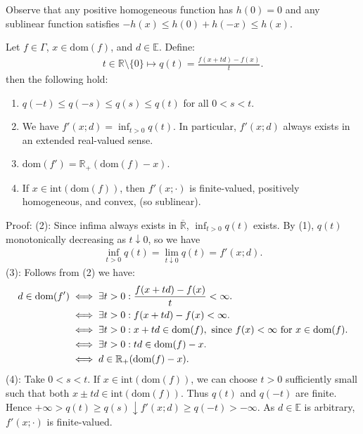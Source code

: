 \documentclass{tufte-handout}
\begin{document}
Observe that any positive homogeneous function has \( h(0) = 0 \) and
any sublinear function satisfies \( -h(x) \le h(0) + h(-x) \le h(x) \).

\begin{Proposition}
    Let \( f\in \Gamma \), \( x\in \text{dom}(f) \), and \( d \in \mathbb{E} \).
    Define:
    \begin{align}
        t\in \mathbb{R} \setminus \{0\} \mapsto q(t) = \frac{f(x + td) - f(x)}{t}.
    \end{align}
    then the following hold:
    \begin{enumerate}
            \item \( q(-t) \leq q(-s) \leq q(s) \leq q(t) \) for all \( 0<s<t \).
            \item We have \( f'(x; d) = \inf_{t>0} q(t) \). In particular, \( f'(x; d) \) always exists in an extended real-valued sense.
            \item \( \text{dom}(f') = \mathbb{R}_+(\text{dom}(f) - x) \).
            \item If \( x \in \text{int}(\text{dom}(f)) \), then \( f'(x; \cdot) \) is finite-valued, positively homogeneous,
            and convex, (so sublinear).
        \end{enumerate}
\end{Proposition}
Proof:
(2): Since infima always exists in \( \overline{\mathbb{R}} \), \( \inf_{t>0}q(t) \)
exists. By (1), \( q(t) \) monotonically decreasing as \( t \downarrow 0 \),
so we have 
\begin{align}
    \inf_{t>0} q(t) = \lim_{t\downarrow 0} q(t) = f'(x; d).
\end{align}
(3): Follows from (2) we have:
\begin{align}
    d \in \text{dom}(f') &\iff \exists  t > 0  : \frac{f(x+td) - f(x)}{t} < \infty.\\
    &\iff \exists  t > 0  : f(x + td) - f(x) < \infty.\\
    &\iff \exists  t > 0  : x + td \in \text{dom}(f), \text{ since \( f(x) < \infty \) for \( x \in \text{dom}(f) \)}.\\
    &\iff \exists  t > 0  : td \in \text{dom}(f) - x.\\
    &\iff d \in \mathbb{R}_+(\text{dom}(f) - x).
\end{align}
(4): Take \( 0<s<t \). If \( x \in \text{int}(\text{dom}(f)) \),
we can choose \( t>0 \) sufficiently small such that both \( x\pm td \in \text{int}(\text{dom}(f)) \).
Thus \( q(t) \) and \( q(-t) \) are finite. 
Hence \( +\infty > q(t) \geq q(s) \downarrow f'(x;d) \geq q(-t) > -\infty \).
As \( d \in \mathbb{E} \) is arbitrary, \( f'(x; \cdot) \) is finite-valued.
\end{document}

